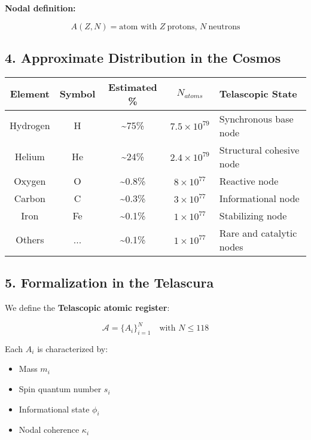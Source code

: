 \documentclass[12pt]{article}
\begin{document}
\textbf{Nodal definition:}

\[
A(Z, N) = \text{atom with } Z\ \text{protons, } N\ \text{neutrons}
\]

\subsection*{4. Approximate Distribution in the Cosmos}

\begin{center}
\begin{tabular}{|c|c|c|c|l|}
\hline
\textbf{Element} & \textbf{Symbol} & \textbf{Estimated \%} & \boldmath$N_{atoms}$ & \textbf{Telascopic State} \\
\hline
Hydrogen & H  & \textasciitilde75\%  & $7.5 \times 10^{79}$ & Synchronous base node \\
Helium   & He & \textasciitilde24\%  & $2.4 \times 10^{79}$ & Structural cohesive node \\
Oxygen   & O  & \textasciitilde0.8\% & $8 \times 10^{77}$   & Reactive node \\
Carbon   & C  & \textasciitilde0.3\% & $3 \times 10^{77}$   & Informational node \\
Iron     & Fe & \textasciitilde0.1\% & $1 \times 10^{77}$   & Stabilizing node \\
Others   & ...& \textasciitilde0.1\% & $1 \times 10^{77}$   & Rare and catalytic nodes \\
\hline
\end{tabular}
\end{center}

\subsection*{5. Formalization in the Telascura}

We define the \textbf{Telascopic atomic register}:

\[
\mathcal{A} = \{A_i\}_{i=1}^{N} \quad \text{with } N \leq 118
\]

Each $A_i$ is characterized by:

\begin{itemize}
    \item Mass $m_i$
    \item Spin quantum number $s_i$
    \item Informational state $\phi_i$
    \item Nodal coherence $\kappa_i$
\end{itemize}
\end{document}
